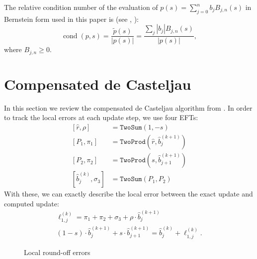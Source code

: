 \documentclass[letterpaper,10pt]{article}
\theoremstyle{definition}
\newcommand{\cond}[1]{\operatorname{cond}\left(#1\right)}
\begin{document}
The relative condition number of the evaluation of \(p(s) = \sum_{j = 0}^n
b_j B_{j, n}(s)\) in Bernstein form used in this paper is (see
\cite{Mainar1999}, \cite{Farouki1987}):
\begin{equation}
\cond{p, s} = \frac{\widetilde{p}\left(s\right)}{
  \left|p(s)\right|} = \frac{\sum_j \left|b_j\right| B_{j, n}(s)}{
  \left|p(s)\right|},
\end{equation}
where \(B_{j, n} \geq 0\).

\section{Compensated de Casteljau}\label{sec:compensated-2}

In this section we review the compensated de Casteljau algorithm
from \cite{Jiang2010}. In order to track the local errors at
each update step, we use four EFTs:
\begin{align}
\left[\widehat{r}, \rho\right] &= \mathtt{TwoSum}(1, -s) \\
\left[P_1, \pi_1\right] &= \mathtt{TwoProd}\left(
    \widehat{r}, \widehat{b}_j^{(k + 1)}\right) \\
\left[P_2, \pi_2\right] &= \mathtt{TwoProd}\left(
    s, \widehat{b}_{j + 1}^{(k + 1)}\right) \\
\left[\widehat{b}_j^{(k)}, \sigma_3\right] &= \mathtt{TwoSum}(P_1, P_2)
\end{align}
With these, we can exactly describe the local error between the exact
update and computed update:
\begin{gather}
\ell_{1, j}^{(k)} = \pi_1 + \pi_2 + \sigma_3 + \rho \cdot
  \widehat{b}_j^{(k + 1)} \label{ell-j} \\
(1 - s) \cdot \widehat{b}_j^{(k + 1)} +
  s \cdot \widehat{b}_{j + 1}^{(k + 1)} =
\widehat{b}_j^{(k)} + \ell_{1, j}^{(k)}.
\end{gather}

\begin{figure}\label{fig:loc-err-accumulate}
\centering
{}
\caption{Local round-off errors}
\end{figure}
\end{document}
